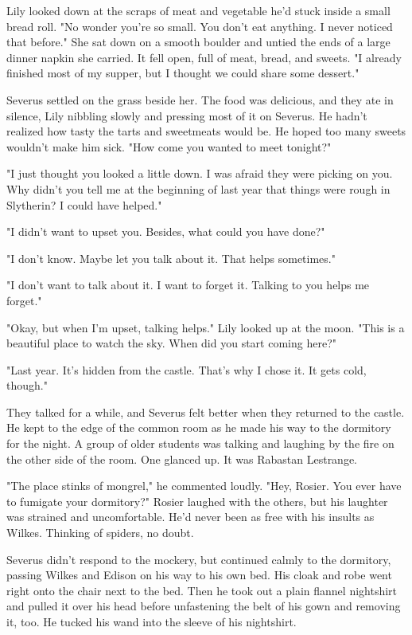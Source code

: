 \documentclass[a4paper,11pt]{article}
\begin{document}
Lily looked down at the scraps of meat and vegetable he'd stuck inside a small bread roll. "No wonder you're so small. You don't eat anything. I never noticed that before." She sat down on a smooth boulder and untied the ends of a large dinner napkin she carried. It fell open, full of meat, bread, and sweets. "I already finished most of my supper, but I thought we could share some dessert."

Severus settled on the grass beside her. The food was delicious, and they ate in silence, Lily nibbling slowly and pressing most of it on Severus. He hadn't realized how tasty the tarts and sweetmeats would be. He hoped too many sweets wouldn't make him sick. "How come you wanted to meet tonight?"

"I just thought you looked a little down. I was afraid they were picking on you. Why didn't you tell me at the beginning of last year that things were rough in Slytherin? I could have helped."

"I didn't want to upset you. Besides, what could you have done?"

"I don't know. Maybe let you talk about it. That helps sometimes."

"I don't want to talk about it. I want to forget it. Talking to you helps me forget."

"Okay, but when I'm upset, talking helps." Lily looked up at the moon. "This is a beautiful place to watch the sky. When did you start coming here?"

"Last year. It's hidden from the castle. That's why I chose it. It gets cold, though."

They talked for a while, and Severus felt better when they returned to the castle. He kept to the edge of the common room as he made his way to the dormitory for the night. A group of older students was talking and laughing by the fire on the other side of the room. One glanced up. It was Rabastan Lestrange.

"The place stinks of mongrel," he commented loudly. "Hey, Rosier. You ever have to fumigate your dormitory?" Rosier laughed with the others, but his laughter was strained and uncomfortable. He'd never been as free with his insults as Wilkes. Thinking of spiders, no doubt.

Severus didn't respond to the mockery, but continued calmly to the dormitory, passing Wilkes and Edison on his way to his own bed. His cloak and robe went right onto the chair next to the bed. Then he took out a plain flannel nightshirt and pulled it over his head before unfastening the belt of his gown and removing it, too. He tucked his wand into the sleeve of his nightshirt.
\end{document}
